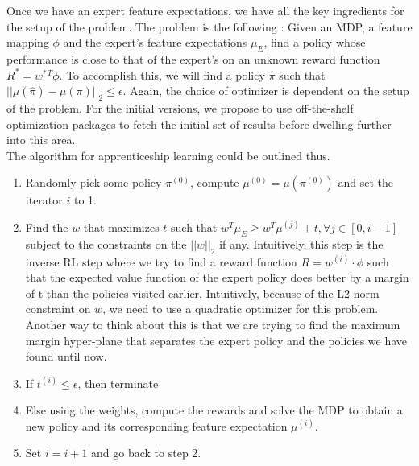 \documentclass[twoside,11pt]{article}
\begin{document}
Once we have an expert feature expectations, we have all the key ingredients for the setup of the problem. The problem is the following : Given an MDP, a feature mapping $\phi$ and the expert's feature expectations $\mu_E$, find a policy whose performance is close to that of the expert's on an unknown reward function $R^* = w^*{^T}\phi$. To accomplish this, we will find a policy $\hat{\pi}$ such that $||\mu(\hat{\pi}) - \mu(\pi)||_2 \leq \epsilon $. Again, the choice of optimizer is dependent on the setup of the problem. For the initial versions, we propose to use off-the-shelf optimization packages to fetch the initial set of results before dwelling further into this area. \\[6pt]
The algorithm for apprenticeship learning could be outlined thus.
\begin{enumerate}
\item Randomly pick some policy $\pi^{(0)}$, compute $\mu^{(0)}= \mu(\pi ^{(0)} )$ and set the iterator $i$ to 1.
\item Find the $w$ that maximizes $t$ such that $w^T \mu_E \geq w^T \mu^{(j)} + t, \forall j \in [0, i-1]$ subject to the constraints on the $||w||_2$ if any. Intuitively, this step is the inverse RL step where we try to find a reward function $R = w ^{(i)} \cdot \phi $ such that the expected value function of the expert policy does better by a margin of t than the policies visited earlier. Intuitively, because of the L2 norm constraint on $w$, we need to use a quadratic optimizer for this problem.  Another way to think about this is that we are trying to find the maximum margin hyper-plane that separates the expert policy and the policies we have found until now.
\item If $t^{(i)} \leq \epsilon$, then terminate
\item Else using the weights, compute the rewards and solve the MDP to obtain a new policy and its corresponding feature expectation $\mu^{(i)}$.
\item Set $i=i+1$ and go back to step 2.
\end{enumerate}
\end{document}
